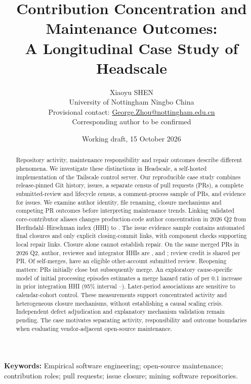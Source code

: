 \documentclass[11pt]{article}
\title{Contribution Concentration and Maintenance Outcomes:\\A Longitudinal Case Study of Headscale}
\author{Xiaoyu SHEN\\
\small University of Nottingham Ningbo China\\
\small Provisional contact: \href{mailto:George.Zhou@nottingham.edu.cn}{George.Zhou@nottingham.edu.cn}\\
\small Corresponding author to be confirmed}
\date{Working draft, 15 October 2026}
\begin{document}
\maketitle
\begin{abstract}
Repository activity, maintenance responsibility and repair
outcomes describe different phenomena. We investigate these distinctions in
Headscale, a self-hosted implementation of the Tailscale control server.
Our reproducible case study combines release-pinned Git history,
\IssueCount{} issues, a separate census of \PRCount{} pull requests (PRs),
a complete submitted-review and lifecycle census, a comment-process sample of
\PilotPRCount{} PRs, and evidence for \EvidenceIssueCount{} issues.
We examine author identity, file renaming,
closure mechanisms and competing PR outcomes before interpreting maintenance
trends. Linking validated core-contributor aliases changes production-code author
concentration in 2026 Q2 from Herfindahl--Hirschman index (HHI)
\QuarterRawHHI{} to \QuarterLinkedHHI{}.
The issue evidence sample contains \EvidenceBotClosures{} automated final
closures and only \EvidenceClosingCommits{} explicit closing-commit links,
with component checks supporting \RepairValidatedCases{} local repair links.
Closure alone cannot establish repair.
On the same \RoleQuarterPRs{} merged PRs in 2026 Q2, author, reviewer and
integrator HHIs are \RoleQuarterAuthorHHI{}, \ReviewQuarterFractionHHI{}
and \RoleQuarterMergerHHI{}; review credit is shared per PR.
Of \SelfMergeCount{} self-merges, \SelfMergeReviewedCount{} have an
eligible other-account submitted review. Reopening matters:
\FirstClosedEventuallyMerged{} PRs initially close but subsequently merge.
An exploratory cause-specific model of initial processing episodes estimates a merge hazard ratio
of \CoxConcentrationHR{} per 0.1 increase in prior integration HHI
(95\% interval \CoxConcentrationLower{}--\CoxConcentrationUpper{}).
Later-period associations are sensitive to calendar-cohort control.
These measurements support concentrated activity and heterogeneous closure
mechanisms, without establishing a causal scaling crisis. Independent defect
adjudication and explanatory mechanism validation remain pending. The case
motivates separating activity, responsibility
and outcome boundaries when evaluating vendor-adjacent open-source maintenance.
\end{abstract}
\noindent\textbf{Keywords:} Empirical software engineering; open-source maintenance;
contribution roles; pull requests; issue closure; mining software repositories.
\end{document}
